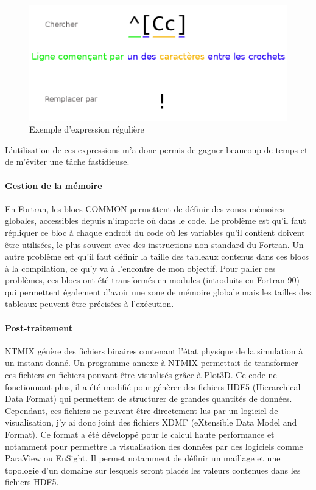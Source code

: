 \begin{figure}[ht]
  \centering
  \includegraphics[scale=0.3]{figures/regex.png}
  \caption{\label{fig:regex}Exemple d'expression régulière}
\end{figure}


L'utilisation de ces expressions m'a donc permis de gagner beaucoup de temps et de m'éviter une tâche fastidieuse.

\paragraph{Gestion de la mémoire}En Fortran, les blocs COMMON permettent de définir des zones mémoires globales, accessibles depuis n'importe où dans le code. Le problème est qu'il faut répliquer ce bloc à chaque endroit du code où les variables qu'il contient doivent être utilisées, le plus souvent avec des instructions non-standard du Fortran. Un autre problème est qu'il faut définir la taille des tableaux contenus dans ces blocs à la compilation, ce qu'y va à l'encontre de mon objectif. Pour palier ces problèmes, ces blocs ont été transformés en modules (introduits en Fortran 90) qui permettent également d'avoir une zone de mémoire globale mais les tailles des tableaux peuvent être précisées à l'exécution.

\paragraph{Post-traitement}NTMIX génère des fichiers binaires contenant l'état physique de la simulation à un instant donné. Un programme annexe à NTMIX permettait de transformer ces fichiers en fichiers pouvant être visualisés grâce à Plot3D. Ce code ne fonctionnant plus, il a été modifié pour génèrer des fichiers HDF5 (Hierarchical Data Format) qui permettent de structurer de grandes quantités de données. Cependant, ces fichiers ne peuvent être directement lus par un logiciel de visualisation, j'y ai donc joint des fichiers XDMF (eXtensible Data Model and Format). Ce format a été développé pour le calcul haute performance et notamment pour permettre la visualisation des données par des logiciels comme ParaView ou EnSight. Il permet notamment de définir un maillage et une topologie d'un domaine sur lesquels seront placés les valeurs contenues dans les fichiers HDF5.



